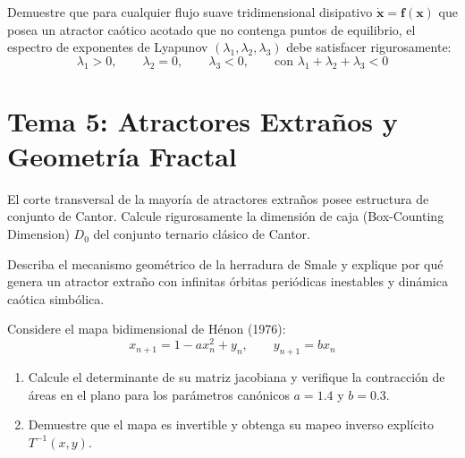 \documentclass[11pt,a4paper]{article}
\begin{document}
\vspace{5mm}

\begin{problema}[Problema 4.5]
Demuestre que para cualquier flujo suave tridimensional disipativo $\dot{\mathbf{x}} = \mathbf{f}(\mathbf{x})$ que posea un atractor caótico acotado que no contenga puntos de equilibrio, el espectro de exponentes de Lyapunov $(\lambda_1, \lambda_2, \lambda_3)$ debe satisfacer rigurosamente:
\[
\lambda_1 > 0, \qquad \lambda_2 = 0, \qquad \lambda_3 < 0, \qquad \text{con } \lambda_1 + \lambda_2 + \lambda_3 < 0
\]
\end{problema}

\vspace{5mm}
\section*{\color{unmsmblue} Tema 5: Atractores Extraños y Geometría Fractal}

\begin{problema}[Problema 5.1]
El corte transversal de la mayoría de atractores extraños posee estructura de conjunto de Cantor. Calcule rigurosamente la dimensión de caja (Box-Counting Dimension) $D_0$ del conjunto ternario clásico de Cantor.
\end{problema}

\vspace{5mm}

\begin{problema}[Problema 5.2]
Describa el mecanismo geométrico de la herradura de Smale y explique por qué genera un atractor extraño con infinitas órbitas periódicas inestables y dinámica caótica simbólica.
\end{problema}

\vspace{5mm}

\begin{problema}[Problema 5.3]
Considere el mapa bidimensional de Hénon (1976):
\[
x_{n+1} = 1 - a x_n^2 + y_n, \qquad y_{n+1} = b x_n
\]
\begin{enumerate}[label=\textbf{\alph*)}]
    \item Calcule el determinante de su matriz jacobiana y verifique la contracción de áreas en el plano para los parámetros canónicos $a = 1.4$ y $b = 0.3$.
    \item Demuestre que el mapa es invertible y obtenga su mapeo inverso explícito $T^{-1}(x, y)$.
\end{enumerate}
\end{problema}
\end{document}
